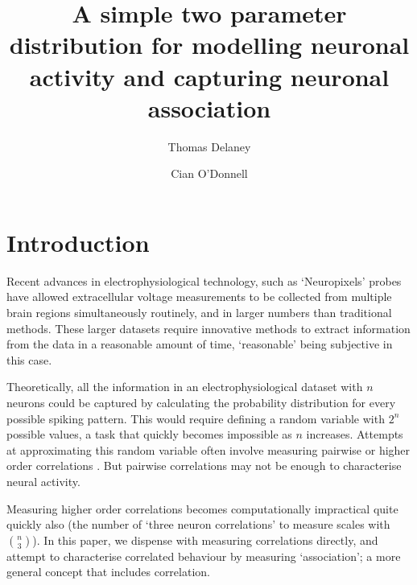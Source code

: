 \documentclass[a4paper,12pt]{article}
\title{A simple two parameter distribution for modelling neuronal activity and capturing neuronal association}
\date{}
\author[1]{Thomas Delaney}
\author[1]{Cian O'Donnell}
\affil[1]{School of Computer Science, Electrical and Electronic Engineering, and Engineering Mathematics, University of Bristol, Bristol, United Kingdom.}
\theoremstyle{definition}
\begin{document}
\maketitle



\section{Introduction}
Recent advances in electrophysiological technology, such as `Neuropixels' probes\cite{jun} have allowed extracellular voltage measurements to be collected from multiple brain regions simultaneously routinely, and in larger numbers than traditional methods. These larger datasets require innovative methods to extract information from the data in a reasonable amount of time, `reasonable' being subjective in this case.

Theoretically, all the information in an electrophysiological dataset with $n$ neurons could be captured by calculating the probability distribution for every possible spiking pattern. This would require defining a random variable with $2^n$ possible values, a task that quickly becomes impossible as $n$ increases. Attempts at approximating this random variable often involve measuring pairwise or higher order correlations \cite{schneidman, flach, ganmor}. But pairwise correlations may not be enough to characterise neural activity\cite{tkacik}.

Measuring higher order correlations becomes computationally impractical quite quickly also (the number of `three neuron correlations' to measure scales with $\binom{n}{3}$). In this paper, we dispense with measuring correlations directly, and attempt to characterise correlated behaviour by measuring `association'; a more general concept that includes correlation.
\end{document}
